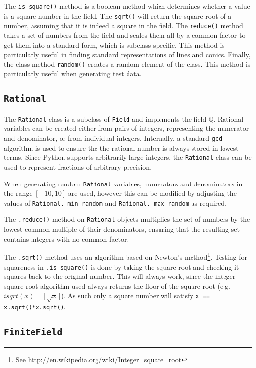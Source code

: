 The \texttt{is\_square()} method is a boolean method which determines whether a value is a square number in the field.
The \texttt{sqrt()} will return the square root of a number, assuming that it is indeed a square in the field.
The \texttt{reduce()} method takes a set of numbers from the field and scales them all by a common factor to get them into a standard form, which is subclass specific.
This method is particularly useful in finding standard representations of lines and conics.
Finally, the class method \texttt{random()} creates a random element of the class.
This method is particularly useful when generating test data.


\subsection{\texttt{Rational}}

The \texttt{Rational} class is a subclass of \texttt{Field} and implements the field $\mathbb{Q}$.
Rational variables can be created either from pairs of integers, representing the numerator and denominator, or from individual integers.
Internally, a standard \texttt{gcd} algorithm is used to ensure the the rational number is always stored in lowest terms.
Since Python supports arbitrarily large integers, the \texttt{Rational} class can be used to represent fractions of arbitrary precision.

When generating random \texttt{Rational} variables, numerators and denominators in the range $[-10, 10]$ are used, however this can be modified by adjusting the values of \texttt{Rational.\_min\_random} and \texttt{Rational.\_max\_random} as required.

The \texttt{.reduce()} method on \texttt{Rational} objects multiplies the set of numbers by the lowest common multiple of their denominators, ensuring that the resulting set contains integers with no common factor.

The \texttt{.sqrt()} method uses an algorithm based on Newton's method\footnote{See \url{http://en.wikipedia.org/wiki/Integer_square_root}}.
Testing for squareness in \texttt{.is\_square()} is done by taking the square root and checking it squares back to the original number.
This will always work, since the integer square root algorithm used always returns the floor of the square root (e.g. $isqrt(x) = \lfloor\sqrt{x}\rfloor$).
As such only a square number will satisfy \texttt{x == x.sqrt()*x.sqrt()}.

\subsection{\texttt{FiniteField}}


